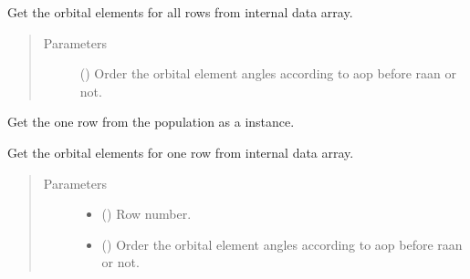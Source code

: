 \documentclass[letterpaper,10pt,english]{sphinxmanual}
\begin{document}
\begin{fulllineitems}
\begin{fulllineitems}
\label{\detokenize{modules/population:population.Population.get_all_orbits}}
Get the orbital elements for all rows from internal data array.
\begin{quote}\begin{description}
\item[{Parameters}] \leavevmode
{} () \textendash{} Order the orbital element angles according to aop before raan or not.

\end{description}\end{quote}

\end{fulllineitems}


\begin{fulllineitems}
\label{\detokenize{modules/population:population.Population.get_object}}
Get the one row from the population as a {\hyperref[\detokenize{modules/space_object:space_object.SpaceObject}]{}} instance.

\end{fulllineitems}


\begin{fulllineitems}
\label{\detokenize{modules/population:population.Population.get_orbit}}
Get the orbital elements for one row from internal data array.
\begin{quote}\begin{description}
\item[{Parameters}] \leavevmode\begin{itemize}
\item {} 
 () \textendash{} Row number.

\item {} 
 () \textendash{} Order the orbital element angles according to aop before raan or not.


\end{itemize}
\end{description}
\end{quote}
\end{fulllineitems}
\end{fulllineitems}
\end{document}
